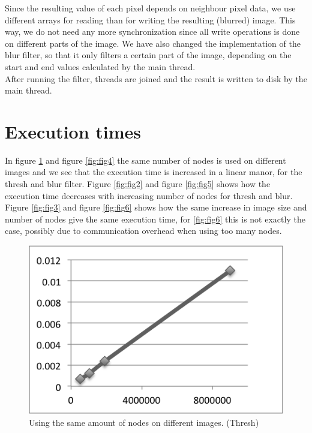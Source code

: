\documentclass[a4paper]{article}
\begin{document}
Since the resulting value of each pixel depends on neighbour pixel data,
we use different arrays for reading than for writing the resulting
(blurred) image. This way, we do not need any more synchronization since
all write operations is done on different parts of the image. We have
also changed the implementation of the blur filter, so that it only
filters a certain part of the image, depending on the start and end
values calculated by the main thread.\\

After running the filter, threads are joined and the result is written
to disk by the main thread.

\section{Execution times}
In figure \ref{fig:fig1} and figure \ref{fig:fig4} the same number of nodes is used on different images and we see that the execution time is increased in a linear manor, for the thresh and blur filter. Figure \ref{fig:fig2} and figure \ref{fig:fig5} shows how the execution time decreases with increasing number of nodes for thresh and blur. Figure \ref{fig:fig3} and figure \ref{fig:fig6} shows how the same increase in image size and number of nodes give the same execution time, for \ref{fig:fig6} this is not exactly the case, possibly due to communication overhead when using too many nodes. 

\begin{figure}[h]
  \centering
  \includegraphics{processor.png}
  \caption{Using the same amount of nodes on different images. (Thresh)}
  \label{fig:fig1}
\end{figure}
\end{document}
